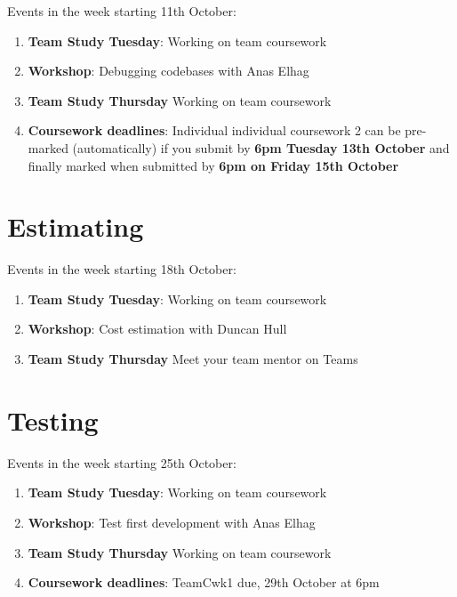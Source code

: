 \documentclass[
]{book}
\providecommand{\tightlist}{%
  \setlength{\itemsep}{0pt}\setlength{\parskip}{0pt}}
\begin{document}
Events in the week starting 11th October:

\begin{enumerate}
\def\labelenumi{\arabic{enumi}.}
\tightlist
\item
  \textbf{Team Study Tuesday}: Working on team coursework
\item
  \textbf{Workshop}: Debugging codebases with Anas Elhag
\item
  \textbf{Team Study Thursday} Working on team coursework
\item
  \textbf{Coursework deadlines}: Individual individual coursework 2 can be pre-marked (automatically) if you submit by \textbf{6pm Tuesday 13th October} and finally marked when submitted by \textbf{6pm on Friday 15th October}
\end{enumerate}

\hypertarget{week4}{%
\section{Estimating}\label{week4}}

Events in the week starting 18th October:

\begin{enumerate}
\def\labelenumi{\arabic{enumi}.}
\tightlist
\item
  \textbf{Team Study Tuesday}: Working on team coursework
\item
  \textbf{Workshop}: Cost estimation with Duncan Hull
\item
  \textbf{Team Study Thursday} Meet your team mentor on Teams
\end{enumerate}

\hypertarget{week5}{%
\section{Testing}\label{week5}}

Events in the week starting 25th October:

\begin{enumerate}
\def\labelenumi{\arabic{enumi}.}
\tightlist
\item
  \textbf{Team Study Tuesday}: Working on team coursework
\item
  \textbf{Workshop}: Test first development with Anas Elhag
\item
  \textbf{Team Study Thursday} Working on team coursework
\item
  \textbf{Coursework deadlines}: TeamCwk1 due, 29th October at 6pm
\end{enumerate}
\end{document}
